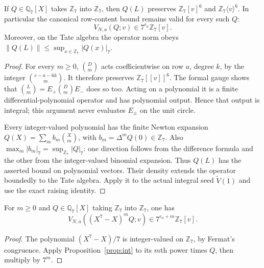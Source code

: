 \documentclass[11pt]{article}
\begin{document}
\begin{proposition}
\label{prop:int}
If $Q\in\mathbb Q_7[X]$ takes $\mathbb Z_7$ into $\mathbb Z_7$,
then $Q(L)$ preserves $\mathbb Z_7[v]^6$ and
$\mathbb Z_7\langle v\rangle^6$.
In particular the canonical row-content bound remains valid
for every such $Q$:
\[
                  V_{N,a}(Q;v)\in7^{e_a}\mathbb Z_7[v].
\]
Moreover, on the Tate algebra the operator norm obeys
$\|Q(L)\|\le\sup_{x\in\mathbb Z_7}|Q(x)|_7$.
\end{proposition}
\begin{proof}
For every $m\ge0$, $\binom Dm$ acts coefficientwise on row $a$,
degree $k$, by the integer $\binom{c-a-6k}{m}$.
It therefore preserves $\mathbb Z_7[[v]]^6$.
The formal gauge shows that
$\binom Lm=E_+\binom Dm E_-$ does so too.
Acting on a polynomial it is a finite differential-polynomial
operator and has polynomial output. Hence that output is
integral; this argument never evaluates $E_\pm$ on the unit circle.

Every integer-valued polynomial has the finite Newton expansion
$Q(X)=\sum_m b_m\binom Xm$, with
$b_m=\Delta^mQ(0)\in\mathbb Z_7$.
Also $\max_m|b_m|_7=\sup_{\mathbb Z_7}|Q|_7$:
one direction follows from the difference formula and the other
from the integer-valued binomial expansion.
Thus $Q(L)$ has the asserted bound on polynomial vectors.
Their density extends the operator boundedly to the Tate algebra.
Apply it to the actual integral seed
$\widetilde V(1)$ and use the exact raising identity.
\end{proof}

\begin{corollary}
\label{cor:extra-content}
For $m\ge0$ and $Q\in\mathbb Q_7[X]$ taking $\mathbb Z_7$ into
$\mathbb Z_7$, one has
\[
 V_{N,a}((X^7-X)^mQ;v)\in 7^{e_a+m}\mathbb Z_7[v].
\]
\end{corollary}
\begin{proof}
The polynomial $(X^7-X)/7$ is integer-valued on $\mathbb Z_7$,
by Fermat's congruence. Apply Proposition~\ref{prop:int} to its
$m$th power times $Q$, then multiply by $7^m$.
\end{proof}
\end{document}
